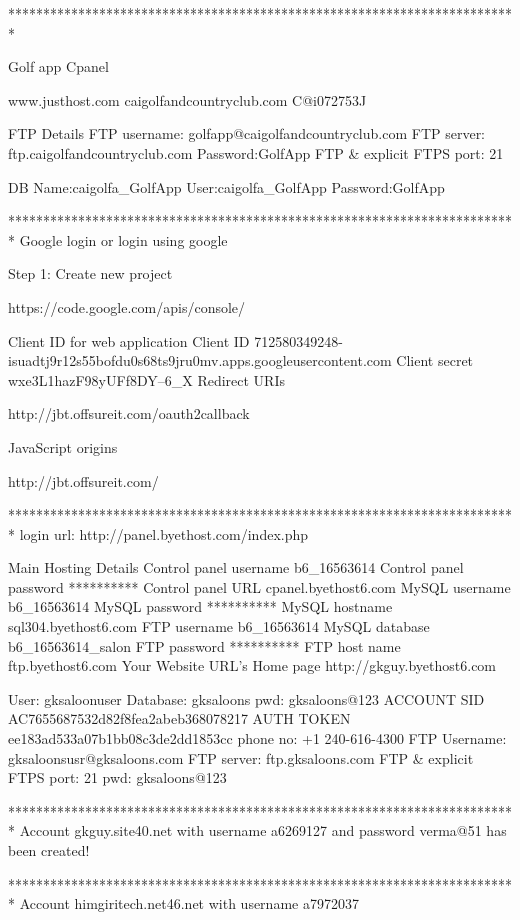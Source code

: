 *************************************************************************

Golf app Cpanel

www.justhost.com	
caigolfandcountryclub.com	
C@i072753J

FTP Details																	
FTP username: golfapp@caigolfandcountryclub.com								
FTP server: ftp.caigolfandcountryclub.com										
Password:GolfApp															
FTP & explicit FTPS port: 21

DB Name:caigolfa_GolfApp
User:caigolfa_GolfApp
Password:GolfApp

*************************************************************************
Google login or login using google 

Step 1: Create new project 

https://code.google.com/apis/console/

Client ID for web application
Client ID
712580349248-isuadtj9r12s55bofdu0s68ts9jru0mv.apps.googleusercontent.com
Client secret
wxe3L1hazF98yUFf8DY--6_X
Redirect URIs

    http://jbt.offsureit.com/oauth2callback

JavaScript origins

    http://jbt.offsureit.com/

*************************************************************************
login url: http://panel.byethost.com/index.php

Main Hosting Details
Control panel username
b6_16563614
Control panel password	**********
Control panel URL
cpanel.byethost6.com
MySQL username
b6_16563614
MySQL password
**********
MySQL hostname
sql304.byethost6.com
FTP username
b6_16563614
MySQL database
b6_16563614_salon
FTP password
**********
FTP host name	ftp.byethost6.com
Your Website URL's
Home page
http://gkguy.byethost6.com

User: gksaloonuser
Database: gksaloons
pwd: gksaloons@123
ACCOUNT SID
AC7655687532d82f8fea2abeb368078217
AUTH TOKEN
ee183ad533a07b1bb08c3de2dd1853cc
phone no: +1 240-616-4300
FTP Username: gksaloonsusr@gksaloons.com
FTP server: ftp.gksaloons.com
FTP & explicit FTPS port:  21
pwd: gksaloons@123

*************************************************************************
Account gkguy.site40.net with username a6269127 and password verma@51 has been created!

*************************************************************************
Account himgiritech.net46.net with username a7972037

